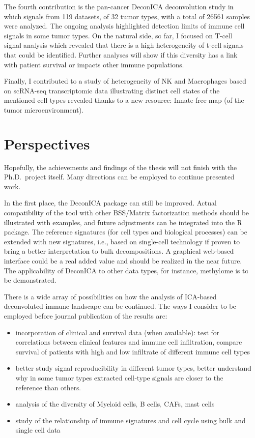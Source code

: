 \documentclass[12pt,]{book}
\providecommand{\tightlist}{%
  \setlength{\itemsep}{0pt}\setlength{\parskip}{0pt}}
\theoremstyle{definition}
\theoremstyle{definition}
\theoremstyle{definition}
\theoremstyle{remark}
\begin{document}
The fourth contribution is the pan-cancer DeconICA deconvolution study
in which signals from 119 datasets, of 32 tumor types, with a total of
26561 samples were analyzed. The ongoing analysis highlighted detection
limits of immune cell signals in some tumor types. On the natural side,
so far, I focused on T-cell signal analysis which revealed that there is
a high heterogeneity of t-cell signals that could be identified. Further
analyses will show if this diversity has a link with patient survival or
impacts other immune populations.

Finally, I contributed to a study of heterogeneity of NK and Macrophages
based on scRNA-seq transcriptomic data illustrating distinct cell states
of the mentioned cell types revealed thanks to a new resource: Innate
free map (of the tumor microenvironment).

\hypertarget{perspectives}{%
\section{Perspectives}\label{perspectives}}

Hopefully, the achievements and findings of the thesis will not finish
with the Ph.D.~project itself. Many directions can be employed to
continue presented work.

In the first place, the DeconICA package can still be improved. Actual
compatibility of the tool with other BSS/Matrix factorization methods
should be illustrated with examples, and future adjustments can be
integrated into the R package. The reference signatures (for cell types
and biological processes) can be extended with new signatures, i.e.,
based on single-cell technology if proven to bring a better
interpretation to bulk decompositions. A graphical web-based interface
could be a real added value and should be realized in the near future.
The applicability of DeconICA to other data types, for instance,
methylome is to be demonstrated.

There is a wide array of possibilities on how the analysis of ICA-based
deconvoluted immune landscape can be continued. The ways I consider to
be employed before journal publication of the results are:

\begin{itemize}
\tightlist
\item
  incorporation of clinical and survival data (when available): test for
  correlations between clinical features and immune cell infiltration,
  compare survival of patients with high and low infiltrate of different
  immune cell types
\item
  better study signal reproducibility in different tumor types, better
  understand why in some tumor types extracted cell-type signals are
  closer to the reference than others.
\item
  analysis of the diversity of Myeloid cells, B cells, CAFs, mast cells
\item
  study of the relationship of immune signatures and cell cycle using
  bulk and single cell data
\end{itemize}
\end{document}

